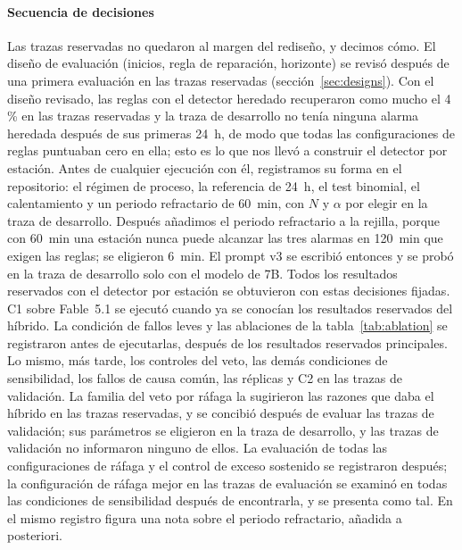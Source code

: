 \documentclass[preprint,11pt]{elsarticle}
\begin{document}
\paragraph{Secuencia de decisiones}
Las trazas reservadas no quedaron al margen del rediseño, y decimos cómo. El diseño de evaluación (inicios, regla de reparación, horizonte) se revisó después de una primera evaluación en las trazas reservadas (sección~\ref{sec:designs}). Con el diseño revisado, las reglas con el detector heredado recuperaron como mucho el 4\,\% en las trazas reservadas y la traza de desarrollo no tenía ninguna alarma heredada después de sus primeras 24~h, de modo que todas las configuraciones de reglas puntuaban cero en ella; esto es lo que nos llevó a construir el detector por estación. Antes de cualquier ejecución con él, registramos su forma en el repositorio: el régimen de proceso, la referencia de 24~h, el test binomial, el calentamiento y un periodo refractario de 60~min, con $N$ y $\alpha$ por elegir en la traza de desarrollo. Después añadimos el periodo refractario a la rejilla, porque con 60~min una estación nunca puede alcanzar las tres alarmas en 120~min que exigen las reglas; se eligieron 6~min. El prompt v3 se escribió entonces y se probó en la traza de desarrollo solo con el modelo de 7B. Todos los resultados reservados con el detector por estación se obtuvieron con estas decisiones fijadas. C1 sobre Fable~5.1 se ejecutó cuando ya se conocían los resultados reservados del híbrido. La condición de fallos leves y las ablaciones de la tabla~\ref{tab:ablation} se registraron antes de ejecutarlas, después de los resultados reservados principales. Lo mismo, más tarde, los controles del veto, las demás condiciones de sensibilidad, los fallos de causa común, las réplicas y C2 en las trazas de validación. La familia del veto por ráfaga la sugirieron las razones que daba el híbrido en las trazas reservadas, y se concibió después de evaluar las trazas de validación; sus parámetros se eligieron en la traza de desarrollo, y las trazas de validación no informaron ninguno de ellos. La evaluación de todas las configuraciones de ráfaga y el control de exceso sostenido se registraron después; la configuración de ráfaga mejor en las trazas de evaluación se examinó en todas las condiciones de sensibilidad después de encontrarla, y se presenta como tal. En el mismo registro figura una nota sobre el periodo refractario, añadida a posteriori.
\end{document}
